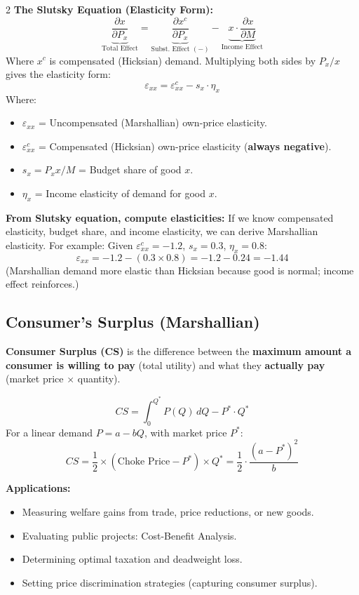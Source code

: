 \documentclass[10pt,a4paper]{article}
\begin{document}
\begin{multicols}{2}
\textbf{The Slutsky Equation (Elasticity Form):}
\[
\underbrace{\frac{\partial x}{\partial P_x}}_{\text{Total Effect}} = \underbrace{\frac{\partial x^c}{\partial P_x}}_{\text{Subst. Effect } (-)} - \underbrace{x \cdot \frac{\partial x}{\partial M}}_{\text{Income Effect}}
\]
Where $x^c$ is compensated (Hicksian) demand. Multiplying both sides by $P_x/x$ gives the elasticity form:
\[
\varepsilon_{xx} = \varepsilon_{xx}^c - s_x \cdot \eta_x
\]
Where:
\begin{itemize}[leftmargin=*,nosep]
    \item $\varepsilon_{xx}$ = Uncompensated (Marshallian) own-price elasticity.
    \item $\varepsilon_{xx}^c$ = Compensated (Hicksian) own-price elasticity (\textbf{always negative}).
    \item $s_x = P_x x / M$ = Budget share of good $x$.
    \item $\eta_x$ = Income elasticity of demand for good $x$.
\end{itemize}

\textbf{From Slutsky equation, compute elasticities:}
If we know compensated elasticity, budget share, and income elasticity, we can derive Marshallian elasticity. For example: Given $\varepsilon_{xx}^c = -1.2$, $s_x = 0.3$, $\eta_x = 0.8$:
\[
\varepsilon_{xx} = -1.2 - (0.3 \times 0.8) = -1.2 - 0.24 = -1.44
\]
(Marshallian demand more elastic than Hicksian because good is normal; income effect reinforces.)

\subsection*{Consumer's Surplus (Marshallian)}

\textbf{Consumer Surplus (CS)} is the difference between the \textbf{maximum amount a consumer is willing to pay} (total utility) and what they \textbf{actually pay} (market price $\times$ quantity).

\[
CS = \int_{0}^{Q^*} P(Q) \, dQ - P^* \cdot Q^*
\]
For a linear demand $P = a - bQ$, with market price $P^*$:
\[
CS = \frac{1}{2} \times (\text{Choke Price} - P^*) \times Q^* = \frac{1}{2} \cdot \frac{(a - P^*)^2}{b}
\]

\textbf{Applications:}
\begin{itemize}[leftmargin=*,nosep]
    \item Measuring welfare gains from trade, price reductions, or new goods.
    \item Evaluating public projects: Cost-Benefit Analysis.
    \item Determining optimal taxation and deadweight loss.
    \item Setting price discrimination strategies (capturing consumer surplus).
\end{itemize}


\end{multicols}
\end{document}
